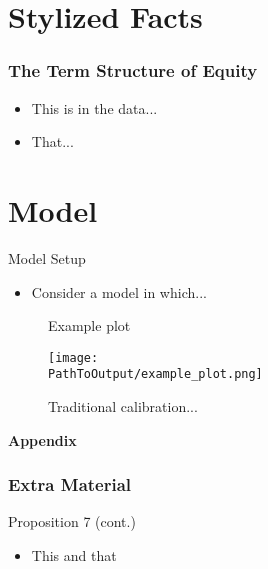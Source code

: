\documentclass[ignorenonframetext, 9pt]{beamer}
\begin{document}
\section{Stylized Facts}


\begin{frame}
  \frametitle{The Term Structure of Equity}
  \begin{itemize}
  \item This is in the data...
  \item That...
  \end{itemize}
\label{slide:stylized_facts}
\end{frame}

\section{Model}


\begin{frame}{Model Setup}
\begin{itemize}
\item Consider a model in which...
\end{itemize}
\label{slide:state-space-framework}
\hyperlink{slide:stylized_facts}{}
\end{frame}

\begin{frame}

\begin{figure}
\centering
\caption{Example plot}
  \centering
  \texttt{[image: \\PathToOutput/example\_plot.png]}
\caption*{
  Traditional calibration...
  }
\label{fig:div-futures-habits-comparison}
\end{figure}

\end{frame}


\appendix
\begin{frame}
  \centering
  \textbf{Appendix}
\end{frame}

\begin{frame}
  \frametitle{Extra Material}
  \label{slide:prop7}
\alert{Proposition 7 (cont.)}
\begin{itemize}
\item This and that
\end{itemize}
\end{frame}


%   
\end{document}
